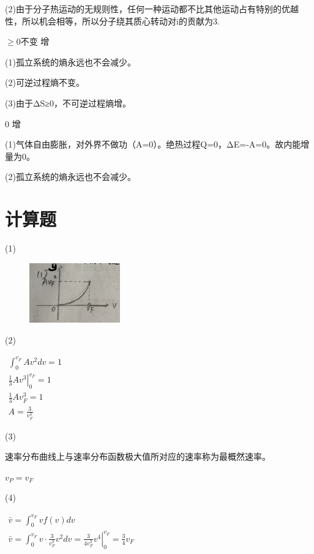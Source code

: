 \documentclass[b5paper,opensource]{./template/qyxf-book}
\begin{document}
(2)由于分子热运动的无规则性，任何一种运动都不比其他运动占有特别的优越性，所以机会相等，所以分子绕其质心转动对i的贡献为3.

$
\geqslant 0 
$\qquad 不变 \qquad 增

\solve
(1)孤立系统的熵永远也不会减少。

(2)可逆过程熵不变。

(3)由于ΔS≥0，不可逆过程熵增。


0 \qquad 增

\solve(1)气体自由膨胀，对外界不做功（A=0）。绝热过程Q=0，ΔE=-A=0。故内能增量为0。

(2)孤立系统的熵永远也不会减少。
\section{计算题}

\solve
(1)
\begin{figure}[!ht]
	\centering
	\includegraphics[width=0.35\textwidth]{2_21.jpg}
\end{figure}
\newpage
(2)

$
\begin{array} { c } { \int _ { 0 } ^ { v _ { F } } A v ^ { 2 } d v = 1 } \\ { \left. \frac { 1 } { 3 } A v ^ { 3 } \right| _ { 0 } ^ { v _ { F } } = 1 } \\ { \frac { 1 } { 3 } A v _ { F } ^ { 3 } = 1 } \\ { A = \frac { 3 } { v _ { F } ^ { 3 } } } \end{array}
$

(3)

速率分布曲线上与速率分布函数极大值所对应的速率称为最概然速率。

$v_P=v_F$

(4)

$
\begin{array} { c } { \bar { v } = \int _ { 0 } ^ { v _ { F } } v f ( v ) d v } \\ { \bar { v } = \int _ { 0 } ^ { v _ { F } } v \cdot \frac { 3 } { v _ { F } ^ { 3 } } v ^ { 2 } d v = \left. \frac { 3 } { 4 v _ { F } ^ { 3 } } v ^ { 4 } \right| _ { 0 } ^ { v _ { F } } = \frac { 3 } { 4 } v _ { F } } \end{array}
$
\end{document}
